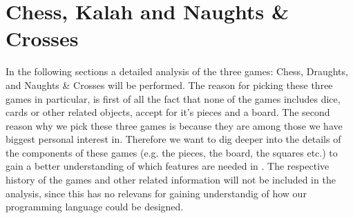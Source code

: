 \section{Chess, Kalah and Naughts \& Crosses}

In the following sections a detailed analysis of the three games: Chess, Draughts, and Naughts \& Crosses will be performed. The reason for picking these three games in particular, is first of all the fact that none of the games includes dice, cards or other related objects, accept for it's pieces and a board. The second reason why we pick these three games is because they are among those we have biggest personal interest in. Therefore we want to dig deeper into the details of the components of these games (e.g. the pieces, the board, the squares etc.) to gain a better understanding of which features are needed in \productname. The respective history of the games and other related information will not be included in the analysis, since this has no relevans for gaining understandig of how our programming language could be designed.  




      